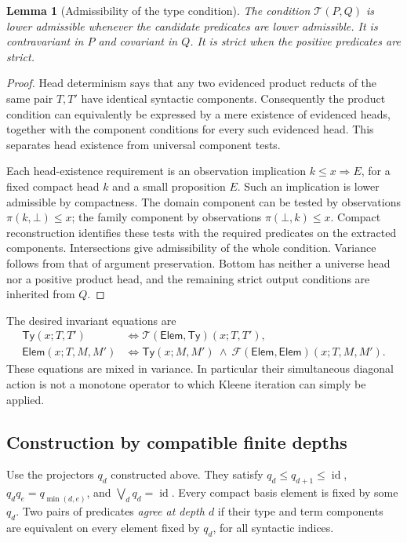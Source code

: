 \documentclass[11pt,a4paper]{article}
\newtheorem{lemma}[theorem]{Lemma}
\theoremstyle{definition}
\theoremstyle{remark}
\newcommand{\lub}{\bigvee}
\newcommand{\TyRel}{\mathsf{Ty}}
\newcommand{\ElemRel}{\mathsf{Elem}}
\begin{document}
\begin{lemma}[Admissibility of the type condition]\label{lem:type-admissible}
The condition $\mathcal T(P,Q)$ is lower admissible whenever the
candidate predicates are lower admissible. It is contravariant in $P$
and covariant in $Q$. It is strict when the positive predicates are strict.
\end{lemma}
\begin{proof}
Head determinism says that any two evidenced product reducts of the same
pair $T,T'$ have identical syntactic components. Consequently the product
condition can equivalently be expressed by a mere existence of evidenced
heads, together with the component conditions for every such evidenced
head. This separates head existence from universal component tests.

Each head-existence requirement is an observation implication
$k\leq x\Longrightarrow E$, for a fixed compact head $k$ and a small
proposition $E$. Such an implication is lower admissible by compactness.
The domain component can be tested by observations $\pi(k,\bot)\leq x$;
the family component by observations $\pi(\bot,k)\leq x$. Compact
reconstruction identifies these tests with the required predicates on
the extracted components. Intersections give admissibility of the whole
condition. Variance follows from that of argument preservation. Bottom
has neither a universe head nor a positive product head, and the
remaining strict output conditions are inherited from $Q$.
\end{proof}

The desired invariant equations are
\begin{equation}\label{eq:relation-equations}
\begin{aligned}
 \TyRel(x;T,T')
  &\Longleftrightarrow\mathcal T(\ElemRel,\TyRel)(x;T,T'),\\
 \ElemRel(x;T,M,M')
  &\Longleftrightarrow\TyRel(x;M,M')\ \wedge\
    \mathcal F(\ElemRel,\ElemRel)(x;T,M,M').
\end{aligned}
\end{equation}
These equations are mixed in variance. In particular their simultaneous
diagonal action is not a monotone operator to which Kleene iteration
can simply be applied.

\subsection{Construction by compatible finite depths}

Use the projectors $q_d$ constructed above. They satisfy
$q_d\leq q_{d+1}\leq\operatorname{id}$,
$q_dq_e=q_{\min(d,e)}$, and $\lub_dq_d=\operatorname{id}$.
Every compact basis element is fixed by some $q_d$.
Two pairs of predicates \emph{agree at depth $d$} if their type and term
components are equivalent on every element fixed by $q_d$, for all
syntactic indices.
\end{document}
